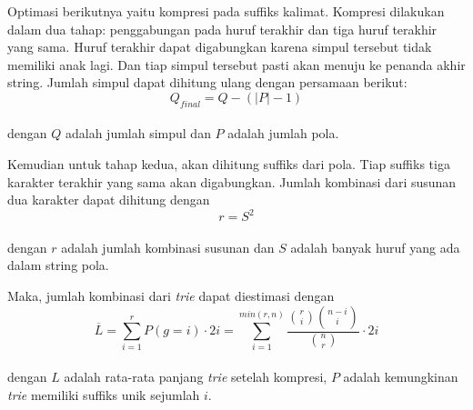     Optimasi berikutnya yaitu kompresi pada suffiks kalimat. Kompresi dilakukan dalam dua tahap: penggabungan pada huruf terakhir dan tiga huruf terakhir yang sama. Huruf terakhir dapat digabungkan karena simpul tersebut tidak memiliki anak lagi. Dan tiap simpul tersebut pasti akan menuju ke penanda akhir string. Jumlah simpul dapat dihitung ulang dengan persamaan berikut: \\
    \begin{equation}
      Q_{final} = Q - \left(\left|P\right| - 1 \right)
    \end{equation} \\
    dengan $Q$ adalah jumlah simpul dan $P$ adalah jumlah pola.

    Kemudian untuk tahap kedua, akan dihitung suffiks dari pola. Tiap suffiks tiga karakter terakhir yang sama akan digabungkan. Jumlah kombinasi dari susunan dua karakter dapat dihitung dengan \\
    \begin{equation}
      r = S^2
    \end{equation} \\
    dengan $r$ adalah jumlah kombinasi susunan dan $S$ adalah banyak huruf yang ada dalam string pola.

    Maka, jumlah kombinasi dari \emph{trie} dapat diestimasi dengan \\
    \begin{equation}
      \overline{L} = 
        \sum_{i=1}^{r} P\left(g = i \right) \cdot 2i =
          \sum_{i=1}^{min\left({r,n} \right)} \frac{\binom{r}{i} \binom{n - i}{i}}{\binom{n}{r}} \cdot 2i
    \end{equation} \\
    dengan $L$ adalah rata-rata panjang \emph{trie} setelah kompresi, $P$ adalah kemungkinan \emph{trie} memiliki suffiks unik sejumlah $i$.
